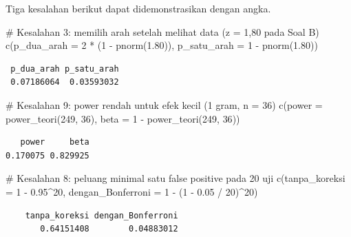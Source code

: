 \documentclass[
  indonesian,
  letterpaper,
]{book}
\newenvironment{Shaded}{\begin{snugshade}}{\end{snugshade}}
\newcommand{\AttributeTok}[1]{\textcolor[rgb]{0.40,0.45,0.13}{#1}}
\newcommand{\CommentTok}[1]{\textcolor[rgb]{0.37,0.37,0.37}{#1}}
\newcommand{\DecValTok}[1]{\textcolor[rgb]{0.68,0.00,0.00}{#1}}
\newcommand{\FloatTok}[1]{\textcolor[rgb]{0.68,0.00,0.00}{#1}}
\newcommand{\FunctionTok}[1]{\textcolor[rgb]{0.28,0.35,0.67}{#1}}
\newcommand{\NormalTok}[1]{\textcolor[rgb]{0.00,0.23,0.31}{#1}}
\newcommand{\SpecialCharTok}[1]{\textcolor[rgb]{0.37,0.37,0.37}{#1}}
\begin{document}
Tiga kesalahan berikut dapat didemonstrasikan dengan angka.

\begin{Shaded}
\begin{Highlighting}[]
\CommentTok{\# Kesalahan 3: memilih arah setelah melihat data (z = 1,80 pada Soal B)}
\FunctionTok{c}\NormalTok{(}\AttributeTok{p\_dua\_arah =} \DecValTok{2} \SpecialCharTok{*}\NormalTok{ (}\DecValTok{1} \SpecialCharTok{{-}} \FunctionTok{pnorm}\NormalTok{(}\FloatTok{1.80}\NormalTok{)), }\AttributeTok{p\_satu\_arah =} \DecValTok{1} \SpecialCharTok{{-}} \FunctionTok{pnorm}\NormalTok{(}\FloatTok{1.80}\NormalTok{))}
\end{Highlighting}
\end{Shaded}

\begin{verbatim}
 p_dua_arah p_satu_arah 
 0.07186064  0.03593032 
\end{verbatim}

\begin{Shaded}
\begin{Highlighting}[]
\CommentTok{\# Kesalahan 9: power rendah untuk efek kecil (1 gram, n = 36)}
\FunctionTok{c}\NormalTok{(}\AttributeTok{power =} \FunctionTok{power\_teori}\NormalTok{(}\DecValTok{249}\NormalTok{, }\DecValTok{36}\NormalTok{), }\AttributeTok{beta =} \DecValTok{1} \SpecialCharTok{{-}} \FunctionTok{power\_teori}\NormalTok{(}\DecValTok{249}\NormalTok{, }\DecValTok{36}\NormalTok{))}
\end{Highlighting}
\end{Shaded}

\begin{verbatim}
   power     beta 
0.170075 0.829925 
\end{verbatim}

\begin{Shaded}
\begin{Highlighting}[]
\CommentTok{\# Kesalahan 8: peluang minimal satu false positive pada 20 uji}
\FunctionTok{c}\NormalTok{(}\AttributeTok{tanpa\_koreksi =} \DecValTok{1} \SpecialCharTok{{-}} \FloatTok{0.95}\SpecialCharTok{\^{}}\DecValTok{20}\NormalTok{, }\AttributeTok{dengan\_Bonferroni =} \DecValTok{1} \SpecialCharTok{{-}}\NormalTok{ (}\DecValTok{1} \SpecialCharTok{{-}} \FloatTok{0.05} \SpecialCharTok{/} \DecValTok{20}\NormalTok{)}\SpecialCharTok{\^{}}\DecValTok{20}\NormalTok{)}
\end{Highlighting}
\end{Shaded}

\begin{verbatim}
    tanpa_koreksi dengan_Bonferroni 
       0.64151408        0.04883012 
\end{verbatim}
\end{document}
